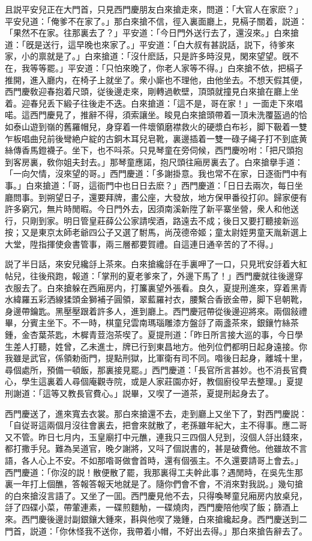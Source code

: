 且説平安兒正在大門首，只見西門慶朋友白來搶走來，問道：「大官人在家麽？」平安兒道：「俺爹不在家了。」那白來搶不信，徑入裏面廳上，見槅子關着，説道：「果然不在家。往那裏去了？」平安道：「今日門外送行去了，還沒來。」白來搶道：「旣是送行，這早晚也來家了。」平安道：「白大叔有甚説話，説下，待爹來家，小的禀就是了。」白來搶道：「沒什麽話，只是許多時沒見，閑來望望。旣不在，我等等罷。」平安道：「只怕來晚了，你老人家等不得。」白來搶不依，把槅子推開，進入廳内，在椅子上就坐了。衆小廝也不理他，由他坐去。不想天假其便，西門慶敎迎春抱着尺頭，従後邊走來，剛轉過軟壁，頂頭就撞見白來搶在廳上坐着。迎春兒丢下緞子往後走不迭。白來搶道：「這不是，哥在家！」一面走下來唱喏。這西門慶見了，推辭不得，須索讓坐。睃見白來搶頭帶着一頂未洗覆盔過的恰如泰山遊到嶺的舊羅帽兒，身穿着一件壞領磨襟救火的硬漿白布衫，脚下靸着一雙乍板唱曲兒前後彎絶户綻的古銅木耳兒皂靴，裏邊插着一雙一碌子䋲子打不到底黄絲傳香馬鐙襪子。坐下，也不呌茶。只見琴童在旁伺候，西門慶吩咐：「把尺頭抱到客房裏，敎你姐夫封去。」那琴童應諾，抱尺頭往廂房裏去了。白來搶擧手道：「一向欠情，沒來望的哥。」西門慶道：「多謝掛意。我也常不在家，日逐衙門中有事。」白來搶道：「哥，這衙門中也日日去麽？」西門慶道：「日日去兩次，每日坐廳問事。到朔望日子，還要拜牌，畫公座，大發放，地方保甲番役打卯。歸家便有許多窮冗，無片時閒暇。今日門外去，因須南溪新陞了新平寨坐營，衆人和他送行，只剛到家。明日管皇莊薛公公家請喫酒，路遠去不成；後日又要打聽接新巡按；又是東京太師老爺四公子又選了駙馬，尚茂德帝姬；童太尉姪男童天胤新選上大堂，陞指揮使僉書管事，兩三層都要賀禮。自這連日通辛苦的了不得。」

説了半日話，來安兒纔㧱上茶來。白來搶纔㧱在手裏呷了一口，只見玳安㧱着大紅帖兒，往後飛跑，報道：「掌刑的夏老爹來了，外邊下馬了！」西門慶就往後邊穿衣服去了。白來搶躲在西廂房内，打簾裏望外張看。良久，夏提刑進來，穿着黑青水緯羅五彩洒線猱頭金獅補子圓領，翠藍羅衬衣，腰繫合香嵌金帶，脚下皂朝靴，身邊帶鑰匙。黑壓壓跟着許多人，進到廳上。西門慶冠帶從後邊迎將來。兩個敍禮畢，分賓主坐下。不一時，棋童兒雲南瑪瑙雕漆方盤㧱了兩盞茶來，銀鑲竹絲茶鍾，金杏葉茶匙，木樨青荳泡茶喫了。夏提刑道：「昨日所言接大巡的事，今日學生差人打聽，姓曾，乙未進士，牌已行到東昌地方。他列位們都明日起身遠接。你我雖是武官，係領勅衙門，提點刑獄，比軍衛有司不同。喒後日起身，離城十里，尋個處所，預備一頓飯，那裏接見罷。」西門慶道：「長官所言甚妙。也不消長官費心，學生這裏着人尋個庵觀寺院，或是人家莊園亦好，教個廚役早去整理。」夏提刑謝道：「這等又教長官費心。」説畢，又喫了一道茶，夏提刑起身去了。

西門慶送了，進來寬去衣裳。那白來搶還不去，走到廳上又坐下了，對西門慶説：「自従哥這兩個月沒往會裏去，把會來就散了，老孫雖年紀大，主不得事。應二哥又不管。昨日七月内，玉皇廟打中元醮，連我只三四個人兒到，沒個人㧱出錢來，都打撒手兒。難為吴道官，晚夕謝將，又呌了個説書的，甚是破費他。他雖故不言語，各人心上不安。不如那喒哥做會首時，還有個張主。不久還要請哥上會去。」西門慶道：「你沒的説！散便散了罷，我那裏得工夫幹此事？遇閒時，在吳先生那裏一年打上個醮，答報答報天地就是了。隨你們會不會，不消來對我説。」幾句搶的白來搶沒言語了。又坐了一囬。西門慶見他不去，只得喚琴童兒廂房内放桌兒，㧱了四碟小菜，帶葷連素，一碟煎麵觔，一碟燒肉，西門慶陪他喫了飯；篩酒上來。西門慶後邊討副銀鑲大鍾來，斟與他喫了幾鍾，白來搶纔起身。西門慶送到二門首，説道：「你休怪我不送你，我帶着小帽，不好出去得。」那白來搶告辭去了。

